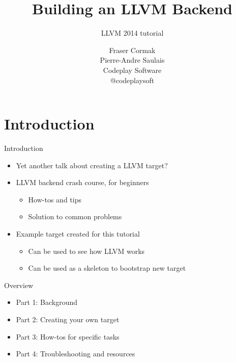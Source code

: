 \documentclass[pdf]{beamer}
\title{Building an LLVM Backend}
\subtitle{LLVM 2014 tutorial}
\author{Fraser Cormak \\ Pierre-Andre Saulais \\ Codeplay Software \\ @codeplaysoft}
\begin{document}

\begin{frame}
\titlepage
\end{frame}


\section{Introduction}

\begin{frame}{Introduction}

\begin{itemize}
    \item Yet another talk about creating a LLVM target?
    \item LLVM backend crash course, for beginners
    \begin{itemize}
        \item How-tos and tips
        \item Solution to common problems
    \end{itemize}  
    \item Example target created for this tutorial
    \begin{itemize}
        \item Can be used to see how LLVM works
        \item Can be used as a skeleton to bootstrap new target
    \end{itemize}
\end{itemize}

\end{frame}


\begin{frame}{Overview}

\begin{itemize}
    \item Part 1: Background
    \item Part 2: Creating your own target
    \item Part 3: How-tos for specific tasks
    \item Part 4: Troubleshooting and resources
\end{itemize}

\end{frame}
\end{document}
